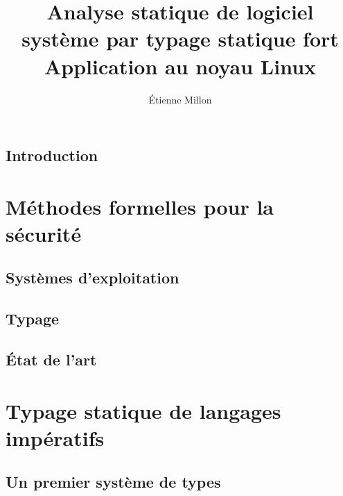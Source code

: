 \documentclass[a4paper,11pt]{memoir}
\title{ \bfseries\LARGE Analyse statique de logiciel système par typage statique fort\\%
      {\mdseries\Large Application au noyau Linux}}
\author{Étienne Millon}
\begin{document}
\frontmatter

\maketitle

\cleartorecto






\tableofcontents

\mainmatter

\chapter{Introduction}


\part{Méthodes formelles pour la sécurité}

\chapter{Systèmes d'exploitation}

\label{cha:os}


\chapter{Typage}



\chapter{État de l'art}



\part{Typage statique de langages impératifs}

\chapter{Un premier système de types}
\end{document}
